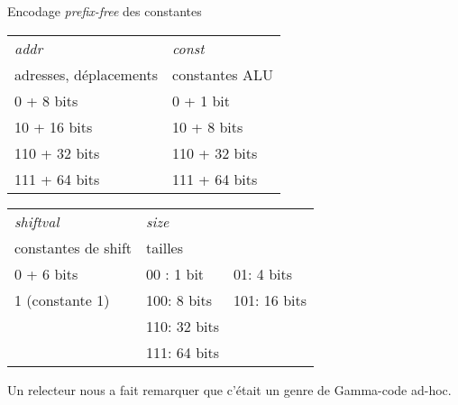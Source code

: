 \documentclass[slidetop,11pt,table]{beamer}
\begin{document}
\begin{frame}{Encodage \emph{prefix-free} des constantes}

  \begin{center}
    \begin{tabular}{|l||l|}
      \hline
      \emph{addr}&  \emph{const}  \\
      adresses, déplacements & constantes ALU    \\
      \hline
      0 + 8 bits               & 0 + 1 bit      \\ 
      10 + 16 bits             & 10 + 8 bits    \\
      110 + 32 bits            & 110 + 32 bits  \\
      111 + 64 bits            & 111 + 64 bits   \\
      \hline
    \end{tabular}
    
    \begin{tabular}{|l||ll|}
      \hline
      \emph{shiftval} & \emph{size}& \\
      constantes de shift & tailles     &              \\
      \hline
      0 + 6 bits          & 00 : 1 bit &  01: 4 bits  \\ 
      1  (constante 1)    & 100: 8 bits& 101: 16 bits \\
                      & 110: 32 bits &            \\
                      & 111: 64 bits &             \\
      \hline
    \end{tabular}
  \end{center}
  Un relecteur nous a fait remarquer que c'était un genre de Gamma-code ad-hoc.
\end{frame}
\end{document}
